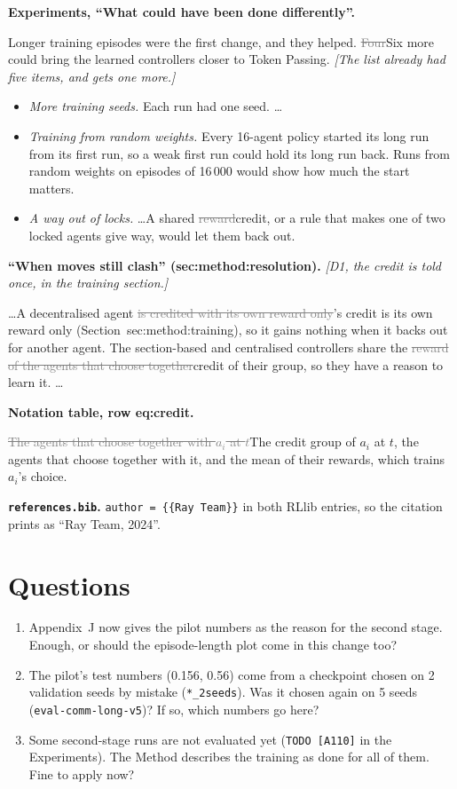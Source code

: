 \documentclass[11pt,a4paper]{article}
\newcommand{\new}[1]{\textcolor{newc}{#1}}
\newcommand{\old}[1]{\textcolor{gray}{\sout{#1}}}
\newcommand{\note}[1]{{\small\itshape [#1]}}
\newcommand{\lab}[1]{\textsf{\footnotesize #1}}
\renewcommand{\ref}[1]{\lab{#1}}
\begin{document}
\textbf{Experiments, ``What could have been done differently''.}

Longer training episodes were the first change, and they helped.
\old{Four}\new{Six} more could bring the learned controllers closer to Token
Passing. \note{The list already had five items, and gets one more.}
\begin{itemize}[nosep]
  \item \emph{More training seeds.} Each run had one seed. \ldots
  \item \new{\emph{Training from random weights.} Every 16-agent policy
    started its long run from its first run, so a weak first run could hold
    its long run back. Runs from random weights on episodes of 16\,000 would
    show how much the start matters.}
  \item \emph{A way out of locks.} \ldots A shared \old{reward}\new{credit}, or
    a rule that makes one of two locked agents give way, would let them back
    out.
\end{itemize}

\textbf{``When moves still clash'' (\lab{sec:method:resolution}).} \note{D1,
the credit is told once, in the training section.}

\ldots A decentralised agent\old{ is credited with its own reward only}\new{'s
credit is its own reward only (Section~\ref{sec:method:training})}, so it
gains nothing when it backs out for another agent. The section-based and
centralised controllers share the \old{reward of the agents that choose
together}\new{credit of their group}, so they have a reason to learn it.
\ldots

\textbf{Notation table, row \lab{eq:credit}.}

\old{The agents that choose together with $a_i$ at $t$}\new{The credit group
of $a_i$ at $t$, the agents that choose together with it}, and the mean of
their rewards, which trains $a_i$'s choice.

\textbf{\texttt{references.bib}.} \texttt{author = \{\{Ray Team\}\}} in both
RLlib entries, so the citation prints as ``Ray Team, 2024''.

\section*{Questions}
\begin{enumerate}[nosep]
  \item Appendix~J now gives the pilot numbers as the reason for the second
    stage. Enough, or should the episode-length plot come in this change
    too?
  \item The pilot's test numbers (0.156, 0.56) come from a checkpoint chosen
    on 2 validation seeds by mistake (\texttt{*\_2seeds}). Was it chosen
    again on 5 seeds (\texttt{eval-comm-long-v5})? If so, which numbers go
    here?
  \item Some second-stage runs are not evaluated yet (\texttt{TODO [A110]} in
    the Experiments). The Method describes the training as done for all of
    them. Fine to apply now?
\end{enumerate}
\end{document}
